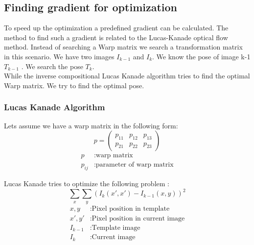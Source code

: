 \documentclass[11pt,a4paper,titlepage,oneside]{report}
\begin{document}
\subsection{Finding gradient for optimization}
To speed up the optimization a predefined gradient can be calculated. The method to find such a gradient is related to the Lucas-Kanade optical flow method. Instead of searching a Warp matrix we search a transformation matrix in this scenario. We have two images $I_{k-1}$ and $I_{k}$. We know the pose of image k-1 $T_{k-1}$ . We search the pose $T_k$.\\
While the inverse compositional Lucas Kanade algorithm tries to find the optimal Warp matrix. We try to find the optimal pose.
\subsubsection{Lucas Kanade Algorithm}
Lets assume we have a warp matrix in the following form:
\begin{equation}\label{eq:lk_warp}
	p=\begin{pmatrix}
		p_{11} & p_{12} & p_{13} \\
		p_{21} & p_{22} & p_{23}
	\end{pmatrix}
\end{equation}
\begin{align*}
	p				&:	\text{warp matrix}\\
	p_{ij}	&:	\text{parameter of warp matrix}
\end{align*}


Lucas Kanade tries to optimize the following problem \cite{inverse_compositional}:
\begin{equation}\label{eq:lk_problem}
	\sum_x\sum_y(I_{k}(x',x')-I_{k-1}(x,y))^2
\end{equation}
\begin{align*}
	x,y				&:	\text{Pixel position in template}\\
	x',y'			&:	\text{Pixel position in current image}\\
	I_{k-1}		&:	\text{Template image}\\
	I_{k}			&:	\text{Current image}
\end{align*}
\end{document}
